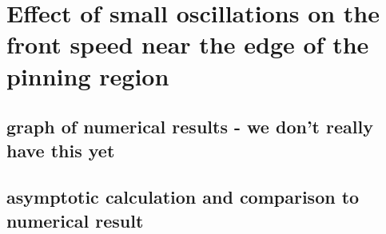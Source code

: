 \documentclass[../main/TimeForcingSHE.tex]{subfiles}
\begin{document}
\section{Effect of small oscillations on the front speed near the edge of the pinning region}
\subsection{graph of numerical results - we don't really have this yet}
\subsection{asymptotic calculation and comparison to numerical result}
\end{document}
